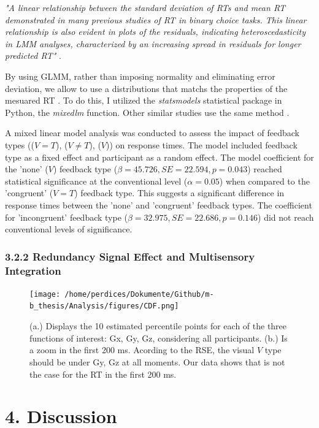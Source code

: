 \documentclass[12pt,oneside,openright]{report}
\begin{document}
\textit{"A linear relationship between the standard deviation of RTs and mean RT demonstrated in many previous studies of RT in binary choice tasks. This linear relationship is also evident in plots of the residuals, indicating heteroscedasticity in LMM analyses, characterized by an increasing spread in residuals for longer predicted RT"} \parencite{Lo2015-fv}.

By using GLMM, rather than imposing normality and eliminating error deviation, we allow to use a distributions that matchs the properties of the mesuared RT \parencite{Lo2015-fv}. To do this, I utilized the \textit{statsmodels} statistical package in Python, the \textit{mixedlm} function. Other similar studies use the same method \parencite{RSE_FBI}.

A mixed linear model analysis was conducted to assess the impact of feedback types (($V=T$), ($V \neq T$), ($V$)) on response times. The model included feedback type as a fixed effect and participant as a random effect. The model coefficient for the 'none' ($V$) feedback type ($\beta = 45.726, SE = 22.594, p = 0.043$) reached statistical significance at the conventional level ($\alpha =0.05 $) when compared to the 'congruent' ($V=T$) feedback type. This suggests a significant difference in response times between the 'none' and 'congruent' feedback types. The coefficient for 'incongruent' feedback type ($\beta = 32.975, SE = 22.686, p = 0.146$) did not reach conventional levels of significance. 

\subsubsection*{3.2.2 Redundancy Signal Effect and Multisensory Integration}

\begin{figure}[!ht]
    \centering
    \texttt{[image: /home/perdices/Dokumente/Github/m-b\_thesis/Analysis/figures/CDF.png]}
    \caption{ (a.) Displays the 10 estimated percentile points for each of the three functions of interest: Gx, Gy, Gz, considering all participants. (b.) Is a zoom in the first 200 ms. Acording to the RSE, the visual $V$ type should be under Gy, Gz at all moments. Our data shows that is not the case for the RT in the first 200 ms.}
    \label{fig:CDF}
\end{figure}

\section*{4. Discussion}
\end{document}

